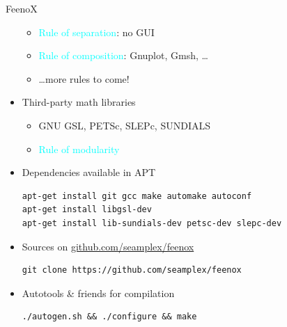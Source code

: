 \documentclass[
  ignorenonframetext,
  aspectratio=169,
]{beamer}
\providecommand{\tightlist}{%
  \setlength{\itemsep}{0pt}\setlength{\parskip}{0pt}}
\begin{document}
\begin{frame}[fragile]{}
\begin{columns}[T]
\begin{column}{0.5\textwidth}
\begin{exampleblock}{FeenoX}
\begin{itemize}
  \begin{itemize}
  \tightlist
  \item
    {\textcolor{cyan}{Rule of {separation}}}: no GUI
  \item
    {\textcolor{cyan}{Rule of {composition}}}: Gnuplot, Gmsh, \ldots{}
  \item
    \ldots more rules to come!
  \end{itemize}
\item
  Third-party math libraries

  \begin{itemize}
  \item
    GNU GSL, PETSc, SLEPc, SUNDIALS
  \item
    {\textcolor{cyan}{Rule of {modularity}}}
  \end{itemize}
\item
  Dependencies available in APT

\begin{lstlisting}[style=terminal]
apt-get install git gcc make automake autoconf
apt-get install libgsl-dev
apt-get install lib-sundials-dev petsc-dev slepc-dev
\end{lstlisting}
\item
  Sources on
  \href{https://github.com/seamplex/feenox}{github.com/seamplex/feenox}

\begin{lstlisting}[style=terminal]
git clone https://github.com/seamplex/feenox
\end{lstlisting}
\item
  Autotools \& friends for compilation

\begin{lstlisting}[style=terminal]
./autogen.sh && ./configure && make
\end{lstlisting}
\end{itemize}
\end{exampleblock}
\end{column}
\end{columns}
\end{frame}
\end{document}
